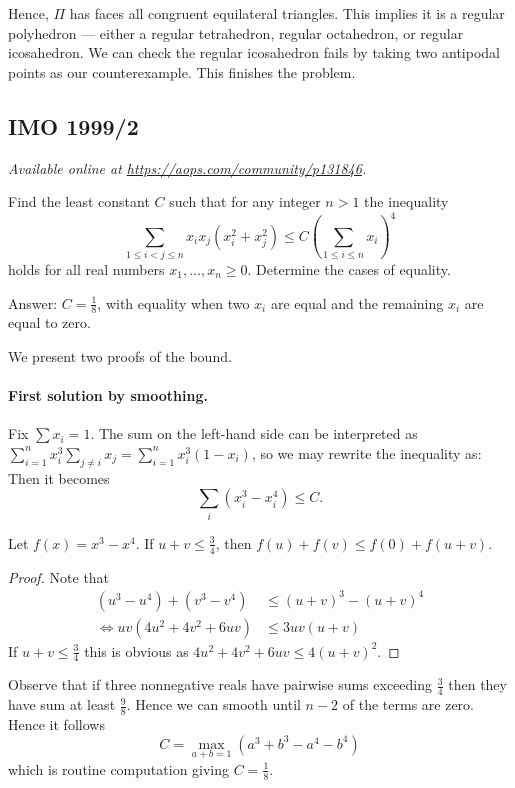 \documentclass[11pt]{scrartcl}
\begin{document}
Hence, $\Pi$ has faces all congruent equilateral triangles.
This implies it is a regular polyhedron --- either
a regular tetrahedron, regular octahedron,
or regular icosahedron.
We can check the regular icosahedron fails by
taking two antipodal points as our counterexample.
This finishes the problem.
\pagebreak

\subsection{IMO 1999/2}
\textsl{Available online at \url{https://aops.com/community/p131846}.}
\begin{mdframed}[style=mdpurplebox,frametitle={Problem statement}]
Find the least constant $C$ such that for any integer $n > 1$ the inequality
\[\sum_{1 \le i < j \le n} x_i x_j (x_i^2 + x_j^2)
  \le C \left( \sum_{1 \le i \le n} x_i \right)^4\]
holds for all real numbers $x_1, \dots, x_n \ge 0$.
Determine the cases of equality.
\end{mdframed}
Answer: $C = \frac 18$, with equality when two $x_i$ are equal
and the remaining $x_i$ are equal to zero.

We present two proofs of the bound.

\paragraph{First solution by smoothing.}
Fix $\sum x_i = 1$.
The sum on the left-hand side can be interpreted as
$\sum_{i=1}^n x_i^3 \sum_{j \neq i} x_j = \sum_{i=1}^n x_i^3(1-x_i)$,
so we may rewrite the inequality as:
Then it becomes \[ \sum_i (x_i^3 - x_i^4) \le C. \]

\begin{claim*}
  [Smoothing]
  Let $f(x) = x^3 - x^4$.
  If $u + v \le \frac 34$, then $f(u) + f(v) \le f(0) + f(u+v)$.
\end{claim*}
\begin{proof}
  Note that
  \begin{align*}
    (u^3-u^4)+(v^3-v^4) &\le (u+v)^3-(u+v)^4 \\
    \iff uv(4u^2+4v^2+6uv) &\le 3uv(u+v)
  \end{align*}
  If $u+v\le \frac 34$ this is obvious as $4u^2+4v^2+6uv \le 4(u+v)^2$.
\end{proof}

Observe that if three nonnegative reals have pairwise sums
exceeding $\frac34$ then they have sum at least $\frac 98$.
Hence we can smooth until $n-2$ of the terms are zero.
Hence it follows
\[ C = \max_{a+b=1} (a^3+b^3-a^4-b^4) \]
which is routine computation giving $C = \frac18$.
\end{document}
